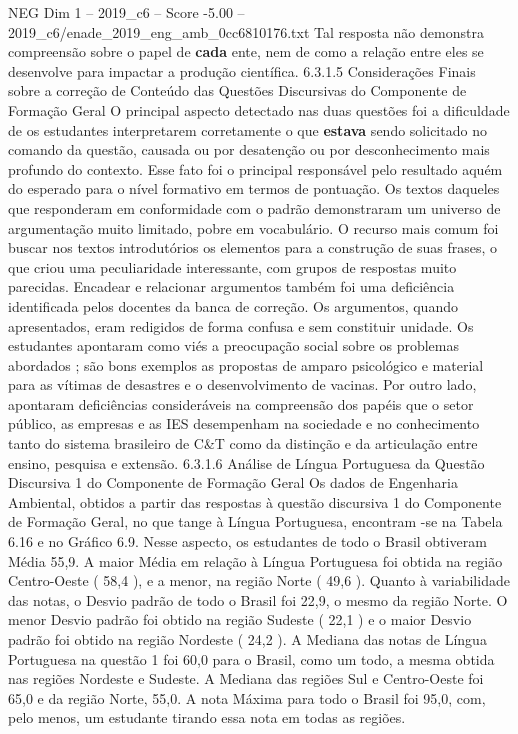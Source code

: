 \begin{textsample}{NEG Dim 1 – 2019\_c6 – Score -5.00 – 2019\_c6/enade\_2019\_eng\_amb\_0cc6810176.txt}
Tal resposta não demonstra compreensão sobre o papel de \textbf{cada} ente, nem de como a relação entre eles se desenvolve para impactar a produção científica. 6.3.1.5 Considerações Finais sobre a correção de Conteúdo das Questões Discursivas do Componente de Formação Geral O principal aspecto detectado nas duas questões foi a dificuldade de os estudantes interpretarem corretamente o que \textbf{estava} sendo solicitado no comando da questão, causada ou por desatenção ou por desconhecimento mais profundo do contexto.
Esse fato foi o principal responsável pelo resultado aquém do esperado para o nível formativo em termos de pontuação.
Os textos daqueles que responderam em conformidade com o padrão demonstraram um universo de argumentação muito limitado, pobre em vocabulário.
O recurso mais comum foi buscar nos textos introdutórios os elementos para a construção de suas frases, o que criou uma peculiaridade interessante, com grupos de respostas muito parecidas.
Encadear e relacionar argumentos também foi uma deficiência identificada pelos docentes da banca de correção.
Os argumentos, quando apresentados, eram redigidos de forma confusa e sem constituir unidade.
Os estudantes apontaram como viés a preocupação social sobre os problemas abordados ; são bons exemplos as propostas de amparo psicológico e material para as vítimas de desastres e o desenvolvimento de vacinas.
Por outro lado, apontaram deficiências consideráveis na compreensão dos papéis que o setor público, as empresas e as IES desempenham na sociedade e no conhecimento tanto do sistema brasileiro de C\&T como da distinção e da articulação entre ensino, pesquisa e extensão. 6.3.1.6 Análise de Língua Portuguesa da Questão Discursiva 1 do Componente de Formação Geral Os dados de Engenharia Ambiental, obtidos a partir das respostas à questão discursiva 1 do Componente de Formação Geral, no que tange à Língua Portuguesa, encontram -se na Tabela 6.16 e no Gráfico 6.9.
Nesse aspecto, os estudantes de todo o Brasil obtiveram Média 55,9.
A maior Média em relação à Língua Portuguesa foi obtida na região Centro-Oeste ( 58,4 ), e a menor, na região Norte ( 49,6 ).
Quanto à variabilidade das notas, o Desvio padrão de todo o Brasil foi 22,9, o mesmo da região Norte.
O menor Desvio padrão foi obtido na região Sudeste ( 22,1 ) e o maior Desvio padrão foi obtido na região Nordeste ( 24,2 ).
A Mediana das notas de Língua Portuguesa na questão 1 foi 60,0 para o Brasil, como um todo, a mesma obtida nas regiões Nordeste e Sudeste.
A Mediana das regiões Sul e Centro-Oeste foi 65,0 e da região Norte, 55,0.
A nota Máxima para todo o Brasil foi 95,0, com, pelo menos, um estudante tirando essa nota em todas as regiões.

\end{textsample}
